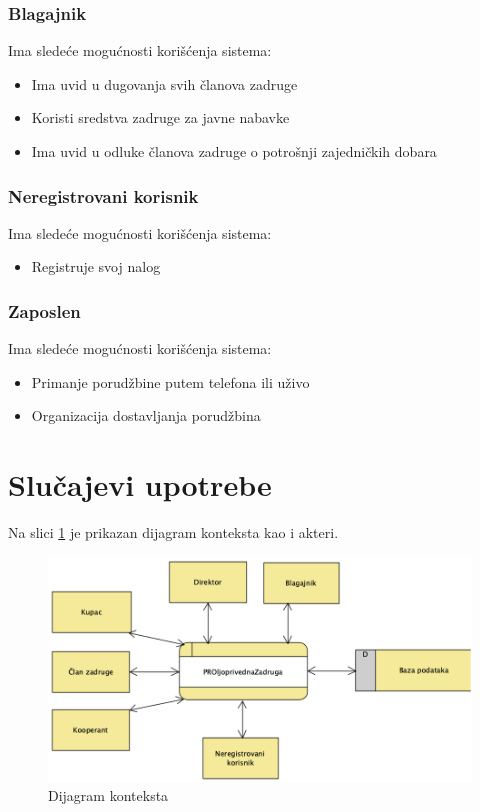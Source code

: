 \documentclass[a4paper]{article}
\begin{document}
\subsubsection{Blagajnik}
\indent Ima sledeće mogućnosti korišćenja sistema:
\begin{itemize}
    \item Ima uvid u dugovanja svih članova zadruge
    \item Koristi sredstva zadruge za javne nabavke
    \item Ima uvid u odluke članova zadruge o potrošnji zajedničkih dobara
\end{itemize}

\subsubsection{Neregistrovani korisnik}
\indent Ima sledeće mogućnosti korišćenja sistema:
\begin{itemize}
    \item Registruje svoj nalog
\end{itemize}

\subsubsection{Zaposlen}
\indent Ima sledeće mogućnosti korišćenja sistema:
\begin{itemize}
    \item Primanje porudžbine putem telefona ili uživo
    \item Organizacija dostavljanja porudžbina
\end{itemize}

\newpage

\section{Slučajevi upotrebe}
Na slici \ref{dtp_nivo_0} je prikazan dijagram konteksta kao i akteri.
\begin{figure}[h!]
    \centering
    \includegraphics[scale=0.72]{images/dtp_nivo_0.png}
    \caption{Dijagram konteksta}
    \label{dtp_nivo_0}
\end{figure}
\end{document}
